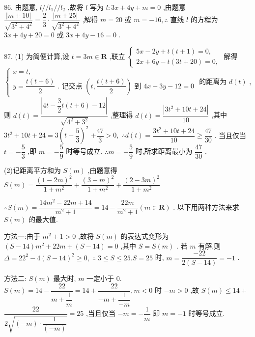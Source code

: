 86. 由题意, $l//{l}_{1}//{l}_{2}$ ,故将 $l$ 写为 $l : {3x} + {4y} + m = 0$ ,由题意 $\dfrac{\left| m + {10}\right| }{\sqrt{{3}^{2} + {4}^{2}}} = \dfrac{2}{3} \cdot  \dfrac{\left| m + {25}\right| }{\sqrt{{3}^{2} + {4}^{2}}}$ ,解得 $m = {20}$ 或 $m =  - {16},\therefore$ 直线 $l$ 的方程为 ${3x} + {4y} + {20} = 0$ 或 ${3x} + {4y} - {16} = 0$ .

87. (1) 为简便计算,设 $t = {3m} \in  \mathbf{R}$ ,联立 $\left\{  \begin{array}{l} {5x} - {2y} + t\left( {t + 1}\right)  = 0, \\  {2x} + {6y} - t\left( {{3t} + {20}}\right)  = 0, \end{array}\right.$ 解得 $\left\{  \begin{array}{l} x = t, \\  y = \dfrac{t\left( {t + 6}\right) }{2}\text{ . 记交点 }\left( {t,\dfrac{t\left( {t + 6}\right) }{2}}\right) \text{ 到 }{4x} - {3y} - {12} = 0 \end{array}\right.$ 的距离为 $d\left( t\right)$ ,则 $d\left( t\right)  = \dfrac{\left| 4t - \dfrac{3}{2}t\left( t + 6\right)  - {12}\right| }{\sqrt{{4}^{2} + {3}^{2}}}$ ,整理得 $d\left( t\right)  = \dfrac{\left| 3{t}^{2} + {10}t + {24}\right| }{10}$ ,其中 $3{t}^{2} + {10t} + {24} = 3{\left( t + \dfrac{5}{3}\right) }^{2}$  $+ \dfrac{47}{3} > 0,\;\therefore d\left( t\right)  = \dfrac{3{t}^{2} + {10t} + {24}}{10} \geq  \dfrac{47}{30}$ . 当且仅当 $t =  - \dfrac{5}{3}$ ,即 $m =  - \dfrac{5}{9}$ 时等号成立. $\therefore m =  - \dfrac{5}{9}$ 时,所求距离最小为 $\dfrac{47}{30}$ .

(2)记距离平方和为 $S\left( m\right)$ ,由题意得 $S\left( m\right)  = \dfrac{{\left( 1 - 2m\right) }^{2}}{1 + {m}^{2}} + \dfrac{{\left( 3 - m\right) }^{2}}{1 + {m}^{2}} + \dfrac{{\left( 2 - 3m\right) }^{2}}{1 + {m}^{2}}$

$\therefore S\left( m\right)  = \dfrac{{14}{m}^{2} - {22m} + {14}}{{m}^{2} + 1} = {14} - \dfrac{22m}{{m}^{2} + 1}\left( {m \in  \mathbf{R}}\right)$ . 以下用两种方法来求 $S\left( m\right)$ 的最大值.

方法一:由于 ${m}^{2} + 1 > 0$ ,故将 $S\left( m\right)$ 的表达式变形为 $\left( {S - {14}}\right) {m}^{2} + {22m} + \left( {S - {14}}\right)  = 0$ ,其中 $S = S\left( m\right)$ . 若 $m$ 有解,则 $\Delta  = {22}^{2} - 4{\left( S - {14}\right) }^{2} \geq  0,\;\therefore \;3 \leq  S \leq  {25}.S = {25}$ 时, $m = \dfrac{-{22}}{2\left( {S - {14}}\right) } =  - 1$ .

方法二: $S\left( m\right)$ 最大时, $m$ 一定小于 0. $S\left( m\right)  = {14} - \dfrac{22}{m + \dfrac{1}{m}} = {14} + \dfrac{22}{-m + \dfrac{1}{-m}},m < 0$ 时 $- m > 0$ ,故 $S\left( m\right)  \leq  {14} +$  $\dfrac{22}{2\sqrt{\left( {-m}\right)  \cdot  \dfrac{1}{\left( -m\right) }}} = {25}$ ,当且仅当 $- m =  - \dfrac{1}{m}$ 即 $m =  - 1$ 时等号成立.

